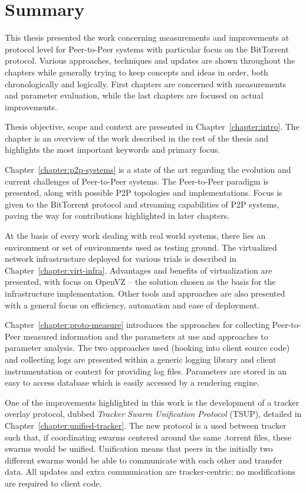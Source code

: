 \section{Summary}
\label{sec:conclusion:summary}

This thesis presented the work concerning measurements and improvements at
protocol level for Peer-to-Peer systems with particular focus on the
BitTorrent protocol. Various approaches, techniques and updates are shown
throughout the chapters while generally trying to keep concepts and ideas in
order, both chronologically and logically. First chapters are concerned with
measurements and parameter evaluation, while the last chapters are focused on
actual improvements.

Thesis objective, scope and context are presented in
Chapter~\ref{chapter:intro}. The chapter is an overview of the work described
in the rest of the thesis and highlights the most important keywords and
primary focus.

Chapter~\ref{chapter:p2p-systems} is a state of the art regarding the
evolution and current challenges of Peer-to-Peer systems. The Peer-to-Peer
paradigm is presented, along with possible P2P topologies and implementations.
Focus is given to the BitTorrent protocol and streaming capabilities of P2P
systems, paving the way for contributions highlighted in later chapters.

At the basis of every work dealing with real world systems, there lies an
environment or set of environments used as testing ground. The virtualized
network infrastructure deployed for various trials is described in
Chapter~\ref{chapter:virt-infra}. Advantages and benefits of virtualization
are presented, with focus on OpenVZ -- the solution chosen as the basis for
the infrastructure implementation. Other tools and approaches are also
presented with a general focus on efficiency, automation and ease of
deployment.

Chapter~\ref{chapter:proto-measure} introduces the approaches for collecting
Peer-to-Peer measured information and the parameters at use and approaches to
parameter analysis. The two approaches used (hooking into client source code)
and collecting logs are presented within a generic logging library and client
instrumentation or context for providing log files. Parameters are stored in
an easy to access database which is easily accessed by a rendering engine.

One of the improvements highlighted in this work is the development of a
tracker overlay protocol, dubbed \textit{Tracker Swarm Unification Protocol}
(TSUP), detailed in Chapter~\ref{chapter:unified-tracker}. The new protocol is
a used between tracker such that, if coordinating swarms centered around the
same .torrent files, these swarms would be unified. Unification means that
peers in the initially two different swarms would be able to communicate with
each other and transfer data. All updates and extra communication are
tracker-centric; no modifications are required to client code.


